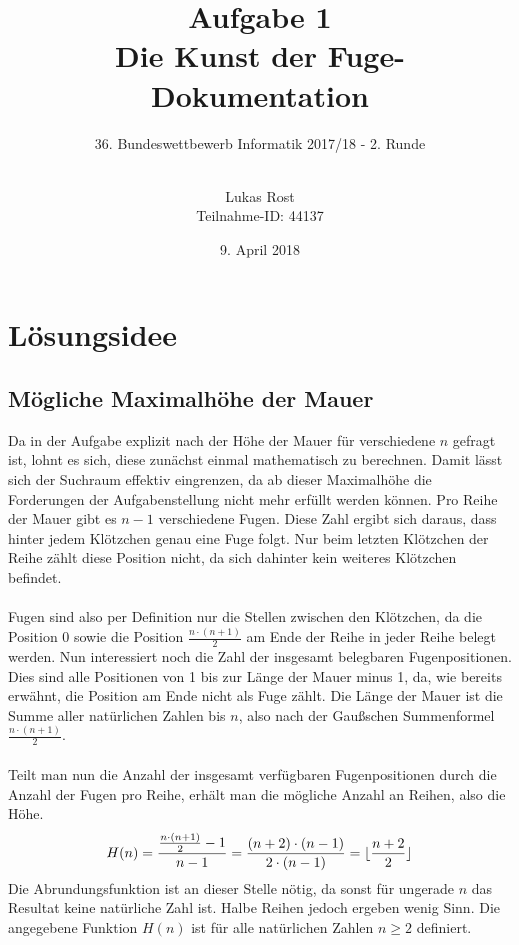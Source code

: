 \documentclass[a4paper, notitlepage, 12pt]{scrartcl}
\author{Lukas Rost \\ \small{Teilnahme-ID: 44137}}
\title{Aufgabe 1 \\ \glqq Die Kunst der Fuge\grqq  - Dokumentation}
\subtitle{36. Bundeswettbewerb Informatik 2017/18 - 2. Runde \\~\\}
\date{9. April 2018}
\DeclarePairedDelimiter\floor{\lfloor}{\rfloor}
\begin{document}
\renewcommand{\contentsname}{\centerline{Inhaltsverzeichnis}}
 \maketitle
 \tableofcontents
 \thispagestyle{empty}
 \newpage
 \setcounter{page}{1}
 
 \section{Lösungsidee}
 \subsection{Mögliche Maximalhöhe der Mauer}
 Da in der Aufgabe explizit nach der Höhe der Mauer für verschiedene $n$ gefragt ist, lohnt es sich, diese zunächst einmal mathematisch zu berechnen. Damit lässt sich der Suchraum effektiv eingrenzen, da ab dieser Maximalhöhe die Forderungen der Aufgabenstellung nicht mehr erfüllt werden können. Pro Reihe der Mauer gibt es $n-1$ verschiedene Fugen. Diese Zahl ergibt sich daraus, dass hinter jedem Klötzchen genau eine Fuge folgt. Nur beim letzten Klötzchen der Reihe zählt diese Position nicht, da sich dahinter kein weiteres Klötzchen befindet. \\ \\
Fugen sind also per Definition nur die Stellen zwischen den Klötzchen, da die Position 0 sowie die Position $\frac{n \cdot (n+1) }{2}$ am Ende der Reihe in jeder Reihe belegt werden. Nun interessiert noch die Zahl der insgesamt belegbaren Fugenpositionen. Dies sind alle Positionen von 1 bis zur Länge der Mauer minus 1, da, wie bereits erwähnt, die Position am Ende nicht als Fuge zählt. Die Länge der Mauer ist die Summe aller natürlichen Zahlen bis $n$, also nach der Gaußschen Summenformel $\frac{n \cdot (n+1) }{2}$. \\ \\
Teilt man nun die Anzahl der insgesamt verfügbaren Fugenpositionen durch die Anzahl der Fugen pro Reihe, erhält man die mögliche Anzahl an Reihen, also die Höhe. 
\begin{equation}
H(n) = \frac{\frac{n \cdot (n+1) }{2} - 1}{n - 1} = \frac{(n + 2) \cdot (n - 1)}{2 \cdot (n - 1)} = \floor{\frac{n + 2}{2}}
\end{equation}
Die Abrundungsfunktion ist an dieser Stelle nötig, da sonst für ungerade $n$ das Resultat keine natürliche Zahl ist. Halbe Reihen jedoch ergeben wenig Sinn. Die angegebene Funktion $H(n)$ ist für alle natürlichen Zahlen $ n \geq 2$ definiert. \\ \\
\end{document}

